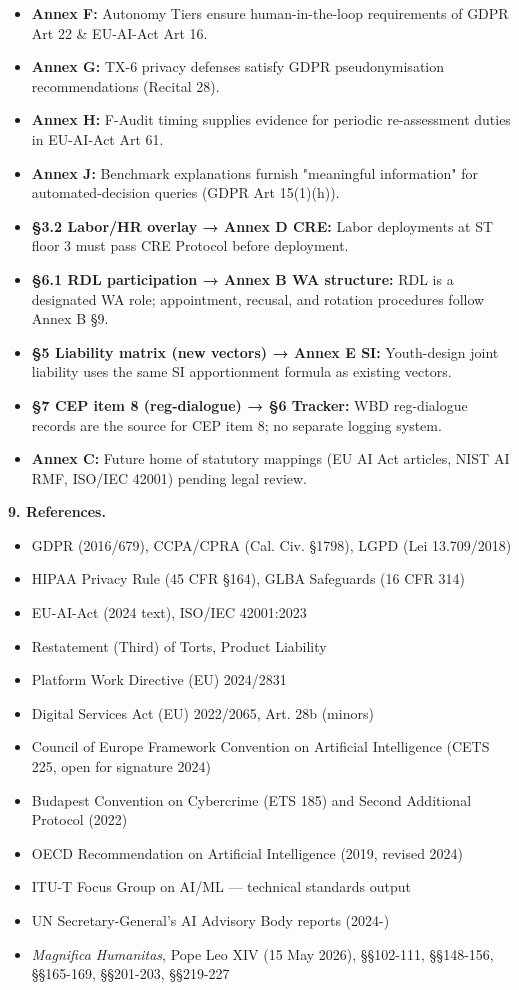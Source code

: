 \documentclass[11pt]{article}
\begin{document}
\begin{itemize}\setlength\itemsep{0pt}
\item \textbf{Annex F:} Autonomy Tiers ensure human-in-the-loop requirements of GDPR Art 22 \& EU-AI-Act Art 16.
\item \textbf{Annex G:} TX-6 privacy defenses satisfy GDPR pseudonymisation recommendations (Recital 28).
\item \textbf{Annex H:} F-Audit timing supplies evidence for periodic re-assessment duties in EU-AI-Act Art 61.
\item \textbf{Annex J:} Benchmark explanations furnish "meaningful information" for automated-decision queries (GDPR Art 15(1)(h)).
\item \textbf{§3.2 Labor/HR overlay → Annex D CRE:} Labor deployments at ST floor 3 must pass CRE Protocol before deployment.
\item \textbf{§6.1 RDL participation → Annex B WA structure:} RDL is a designated WA role; appointment, recusal, and rotation procedures follow Annex B §9.
\item \textbf{§5 Liability matrix (new vectors) → Annex E SI:} Youth-design joint liability uses the same SI apportionment formula as existing vectors.
\item \textbf{§7 CEP item 8 (reg-dialogue) → §6 Tracker:} WBD reg-dialogue records are the source for CEP item 8; no separate logging system.
\item \textbf{Annex C:} Future home of statutory mappings (EU AI Act articles, NIST AI RMF, ISO/IEC 42001) pending legal review.
\end{itemize}


\textbf{9. References.}


\begin{itemize}\setlength\itemsep{0pt}
\item GDPR (2016/679), CCPA/CPRA (Cal. Civ. §1798), LGPD (Lei 13.709/2018)
\item HIPAA Privacy Rule (45 CFR §164), GLBA Safeguards (16 CFR 314)
\item EU-AI-Act (2024 text), ISO/IEC 42001:2023
\item Restatement (Third) of Torts, Product Liability
\item Platform Work Directive (EU) 2024/2831
\item Digital Services Act (EU) 2022/2065, Art. 28b (minors)
\item Council of Europe Framework Convention on Artificial Intelligence (CETS 225, open for signature 2024)
\item Budapest Convention on Cybercrime (ETS 185) and Second Additional Protocol (2022)
\item OECD Recommendation on Artificial Intelligence (2019, revised 2024)
\item ITU-T Focus Group on AI/ML — technical standards output
\item UN Secretary-General's AI Advisory Body reports (2024-)
\item \textit{Magnifica Humanitas}, Pope Leo XIV (15 May 2026), §§102-111, §§148-156, §§165-169, §§201-203, §§219-227
\end{itemize}
\end{document}
